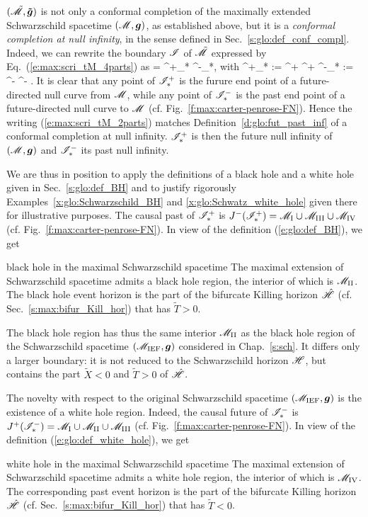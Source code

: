 $(\tilde{\mathscr{M}},\bm{\tilde{g}})$ is not only a conformal
completion of the maximally extended Schwarzschild spacetime $(\mathscr{M},\bm{g})$,
as established above, but it is a \emph{conformal completion at null infinity}, in the sense defined in Sec.~\ref{s:glo:def_conf_compl}.
Indeed, we can rewrite the boundary $\mathscr{I}$
of $\tilde{\mathscr{M}}$ expressed by Eq.~(\ref{e:max:scri_tM_4parts}) as
\be \label{e:max:scri_tM_2parts}
    \scri = \scri^+_* \cup \scri^-_*,
\ee
with
\be
    \scri^+_* := \scri^+ ^+ \qand
    \scri^-_* := \scri^- ^- .
\ee
It is clear that any point of $\mathscr{I}^+_*$ is the furure end point of a future-directed
null curve from $\mathscr{M}$, while any point of $\mathscr{I}^-_*$ is the past end point
of a future-directed null curve to $\mathscr{M}$
(cf. Fig.~\ref{f:max:carter-penrose-FN}). Hence the writing (\ref{e:max:scri_tM_2parts})
matches Definition~\ref{d:glo:fut_past_inf} of a conformal
completion at null infinity. $\mathscr{I}^+_*$ is then the future null infinity
of $(\mathscr{M}, \bm{g})$ and $\mathscr{I}^-_*$ its past null infinity.

We are thus in position to apply the definitions of a black hole and a white hole
given in Sec.~\ref{s:glo:def_BH} and to justify rigorously
Examples~\ref{x:glo:Schwarzschild_BH} and \ref{x:glo:Schwatz_white_hole}
given there for illustrative purposes.
The causal past of $\mathscr{I}^+_*$ is $J^-(\mathscr{I}^+_*) = \mathscr{M}_{\rm I}\cup \mathscr{M}_{\rm III}\cup \mathscr{M}_{\rm IV}$
(cf. Fig.~\ref{f:max:carter-penrose-FN}). In view of the definition
(\ref{e:glo:def_BH}), we get
\begin{tprop}{black hole in the maximal Schwarzschild spacetime}{}
The maximal extension of Schwarzschild spacetime admits a black hole region,
the interior of which is $\mathscr{M}_{\rm II}$. The black hole event horizon is the
part of the bifurcate Killing horizon $\hat{\mathscr{H}}$ (cf. Sec.~\ref{s:max:bifur_Kill_hor})
that has $\tilde{T}>0$.
\end{tprop}
The black hole region has thus the same interior $\mathscr{M}_{\rm II}$ as the black hole region
of the Schwarzschild spacetime $(\mathscr{M}_{\rm IEF}, \bm{g})$ considered in Chap.~\ref{s:sch}.
It differs only a larger boundary: it is not reduced to the Schwarzschild horizon $\mathscr{H}$,
but contains the part $\tilde{X}<0$ and $\tilde{T}>0$ of $\hat{\mathscr{H}}$.

The novelty with respect to the original Schwarzschild spacetime $(\mathscr{M}_{\rm IEF}, \bm{g})$
is the existence of a white hole region. Indeed, the causal future of $\mathscr{I}^-_*$ is
$J^+(\mathscr{I}^-_*) = \mathscr{M}_{\rm I}\cup \mathscr{M}_{\rm II}\cup \mathscr{M}_{\rm III}$
(cf. Fig.~\ref{f:max:carter-penrose-FN}). In view of the definition
(\ref{e:glo:def_white_hole}), we get
\begin{tprop}{white hole in the maximal Schwarzschild spacetime}{}
The maximal extension of Schwarzschild spacetime admits a white hole region,
the interior of which is $\mathscr{M}_{\rm IV}$. The corresponding past event horizon is the
part of the bifurcate Killing horizon $\hat{\mathscr{H}}$ (cf. Sec.~\ref{s:max:bifur_Kill_hor})
that has $\tilde{T}<0$.
\end{tprop}

